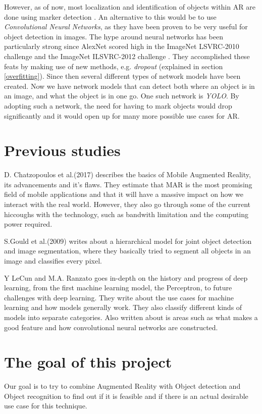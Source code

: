However, as of now, most localization and identification of objects within AR are done using 
marker detection \cite{markerDetection}. An alternative to this would be to use 
\textit{Convolutional Neural Networks}, as they have been proven to be very useful for 
object detection in 
images. The hype around neural networks has been particularly strong since AlexNet scored 
high in the ImageNet LSVRC-2010 challenge and the ImageNet ILSVRC-2012 challenge 
\cite{NIPS2012_4824}. They accomplished these feats by making use of new methods, e.g. 
\textit{dropout} (explained in section \ref{overfitting}). Since then several different types of network models have been created. 
Now we have network models that can detect both where an object is in an image, and what 
the object is in one go. One such network is \textit{YOLO}\cite{YOLO1}. By adopting such a 
network, the need for having to mark objects would drop significantly and it would open up 
for many more possible use cases for AR.
 
\section{Previous studies}
\label{subsecPrevStud}
D. Chatzopoulos et al.(2017) describes the basics of Mobile Augmented Reality, its advancements and it's flaws. They estimate that MAR is the most promising field of mobile applications and that it will have a massive impact on how we interact with the real world. However, they also go through some of the current hiccoughs with the technology, such as bandwith limitation and the computing power required. 
\cite{MARS}

S.Gould et al.(2009) writes about a hierarchical model for joint object detection and image segmentation, where they basically tried to segment all objects in an image and classifies every pixel. 
\cite{NIPS2009_3766}


Y LeCun and M.A. Ranzato goes in-depth on the history and progress of deep learning, from the first machine learning model, the Perceptron, to future challenges with deep learning. They write about the use cases for machine learning and how models generally work. They also classify different kinds of models into separate categories. Also written about is areas such as what makes a good feature and how convolutional neural networks are constructed.
\cite{deepLearningTutorial}


\section{The goal of this project}
\label{subsecGoal}
Our goal is to try to combine Augmented Reality with Object detection and Object recognition to find out if it is feasible and if there is an actual desirable use case for this technique. 

